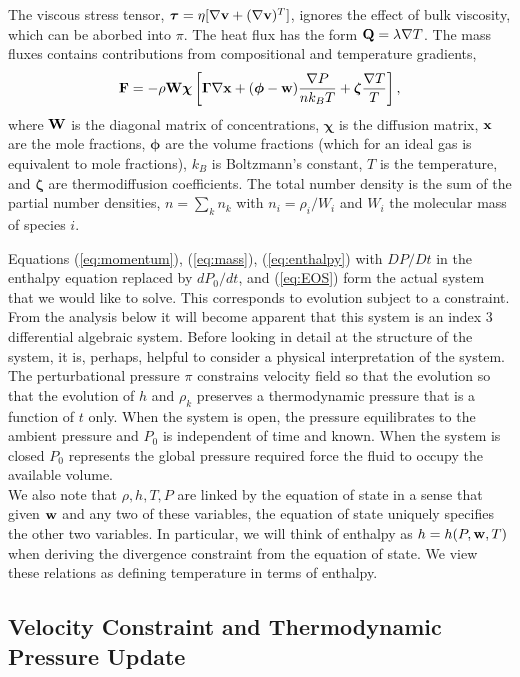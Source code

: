 \documentclass[final]{siamltex}
\def\Fb {{\bf F}}
\def\Qb {{\bf Q}}
\def\vb {{\bf v}}
\def\wb {{\bf w}}
\def\Wb {{\bf W}}
\def\xb {{\bf x}}
\def\chib   {\boldsymbol{\chi}}
\def\Gammab {\boldsymbol{\Gamma}}
\def\phib   {\boldsymbol{\phi}}
\def\taub   {\boldsymbol{\tau}}
\def\zetab  {\boldsymbol{\zeta}}
\begin{document}
The viscous stress tensor,
$\taub = \eta[\nabla\vb + (\nabla\vb)^T]$,
ignores the effect of bulk viscosity, which can be aborbed into $\pi$.
The heat flux has the form $\Qb = \lambda\nabla T$.
The mass fluxes contains contributions from 
compositional and temperature gradients,
\begin{equation}
\Fb = -\rho\Wb\chib\left[\Gammab\nabla\xb + (\phib - \wb)\frac{\nabla P}{n k_B T} + \zetab\frac{\nabla T}{T}\right],
\end{equation}
where $\Wb$ is the diagonal matrix of concentrations,
$\chib$ is the diffusion matrix, $\xb$ are the mole fractions,
$\phib$ are the volume fractions (which for an ideal gas is equivalent to mole fractions),
$k_B$ is Boltzmann's constant,
$T$ is the temperature, and $\zetab$ are thermodiffusion coefficients.  The total
number density is the sum of the partial number densities, $n=\sum_kn_k$ with
$n_i=\rho_i/W_i$ and $W_i$ the molecular mass of species $i$.

Equations (\ref{eq:momentum}), (\ref{eq:mass}), (\ref{eq:enthalpy})
with $DP/Dt$ in the enthalpy equation replaced by $dP_0/dt$, and (\ref{eq:EOS})
form the actual system that we would like to solve.
This corresponds to evolution subject to a constraint.  From the analysis below it 
will become apparent that this system is an index 3 differential algebraic system.
Before looking in detail at the structure of the system, it is, perhaps, helpful to 
consider a physical interpretation of the
system.  The perturbational pressure $\pi$ constrains velocity field so that
the evolution so that the evolution of $h$ and $\rho_k$
preserves a thermodynamic pressure that is a function of $t$ only.
When the system is open, the pressure
equilibrates to the ambient pressure and $P_0$ is independent of time and known.
When the system is closed
$P_0$ represents the global pressure
required force the fluid to occupy the available volume.\\

We also note that $\rho, h, T, P$ are linked by the equation of state in a sense that given
$\wb$ and any two of these variables, the equation of state uniquely specifies the other
two variables.  In particular, we will think of enthalpy as $h = h(P,\wb,T)$ when deriving
the divergence constraint from the equation of state.
We view these relations as defining temperature in terms of enthalpy.

\subsection{Velocity Constraint and Thermodynamic Pressure Update}
\end{document}
